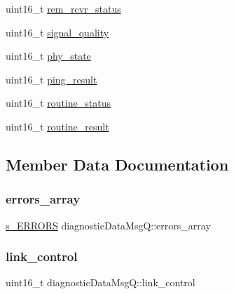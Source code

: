 \begin{DoxyCompactItemize}
\item 
uint16\+\_\+t \mbox{\hyperlink{structdiagnostic_data_msg_q_a9df57b9322c5062e933a4b249464b189}{rem\+\_\+rcvr\+\_\+status}}
\item 
uint16\+\_\+t \mbox{\hyperlink{structdiagnostic_data_msg_q_a388d4481911a1758675d14b3e6307f52}{signal\+\_\+quality}}
\item 
uint16\+\_\+t \mbox{\hyperlink{structdiagnostic_data_msg_q_a7c689ed948d10149b201b3ec4d54a8bb}{phy\+\_\+state}}
\item 
uint16\+\_\+t \mbox{\hyperlink{structdiagnostic_data_msg_q_af2a0714848a69b83e2c3d17d7aeb099e}{ping\+\_\+result}}
\item 
uint16\+\_\+t \mbox{\hyperlink{structdiagnostic_data_msg_q_adb2396af85f9e77dfc948b269866e6f3}{routine\+\_\+status}}
\item 
uint16\+\_\+t \mbox{\hyperlink{structdiagnostic_data_msg_q_a2b67a75dbc3b688426ca1449a3dd58a1}{routine\+\_\+result}}
\end{DoxyCompactItemize}


\subsection{Member Data Documentation}
\mbox{\label{structdiagnostic_data_msg_q_a70a56a13a2c9f8f28679b51484db2557}} 
\subsubsection{\texorpdfstring{errors\+\_\+array}{errors\_array}}
{\footnotesize\ttfamily \mbox{\hyperlink{__module3_8h_aed782b3a5727361a6b656be14d539f9c}{s\+\_\+\+E\+R\+R\+O\+RS}} diagnostic\+Data\+Msg\+Q\+::errors\+\_\+array}

\mbox{\label{structdiagnostic_data_msg_q_a7e4ef1e3f7dd556bd9e255de7a597157}} 
\subsubsection{\texorpdfstring{link\+\_\+control}{link\_control}\hspace{0.1cm}{\footnotesize\ttfamily [1/2]}}
{\footnotesize\ttfamily uint16\+\_\+t diagnostic\+Data\+Msg\+Q\+::link\+\_\+control}

